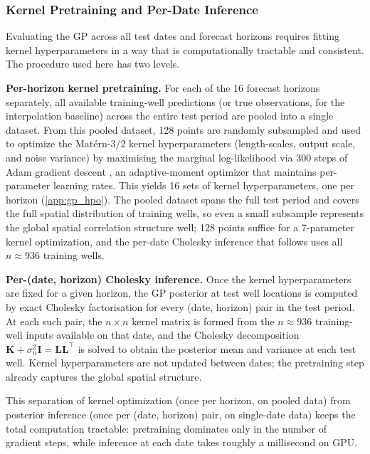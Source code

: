 \subsubsection{Kernel Pretraining and Per-Date Inference}
\label{sec:gp_inference_procedure}

Evaluating the GP across all test dates and forecast horizons requires fitting kernel hyperparameters in a way that is computationally tractable and consistent. The procedure used here has two levels.

\textbf{Per-horizon kernel pretraining.} For each of the 16 forecast horizons separately, all available training-well predictions (or true observations, for the interpolation baseline) across the entire test period are pooled into a single dataset. From this pooled dataset, 128 points are randomly subsampled and used to optimize the Matérn-3/2 kernel hyperparameters (length-scales, output scale, and noise variance) by maximising the marginal log-likelihood via 300 steps of Adam gradient descent \citep{kingma2015adam}, an adaptive-moment optimizer that maintains per-parameter learning rates. This yields 16 sets of kernel hyperparameters, one per horizon (\cref{app:gp_hpo}). The pooled dataset spans the full test period and covers the full spatial distribution of training wells, so even a small subsample represents the global spatial correlation structure well; 128 points suffice for a 7-parameter kernel optimization, and the per-date Cholesky inference that follows uses all $n \approx 936$ training wells.

\textbf{Per-(date, horizon) Cholesky inference.} Once the kernel hyperparameters are fixed for a given horizon, the GP posterior at test well locations is computed by exact Cholesky factorisation for every (date, horizon) pair in the test period. At each such pair, the $n \times n$ kernel matrix is formed from the $n \approx 936$ training-well inputs available on that date, and the Cholesky decomposition $\mathbf{K} + \sigma_n^2 \mathbf{I} = \mathbf{L}\mathbf{L}^\top$ is solved to obtain the posterior mean and variance at each test well. Kernel hyperparameters are not updated between dates; the pretraining step already captures the global spatial structure.

This separation of kernel optimization (once per horizon, on pooled data) from posterior inference (once per (date, horizon) pair, on single-date data) keeps the total computation tractable: pretraining dominates only in the number of gradient steps, while inference at each date takes roughly a millisecond on GPU.


